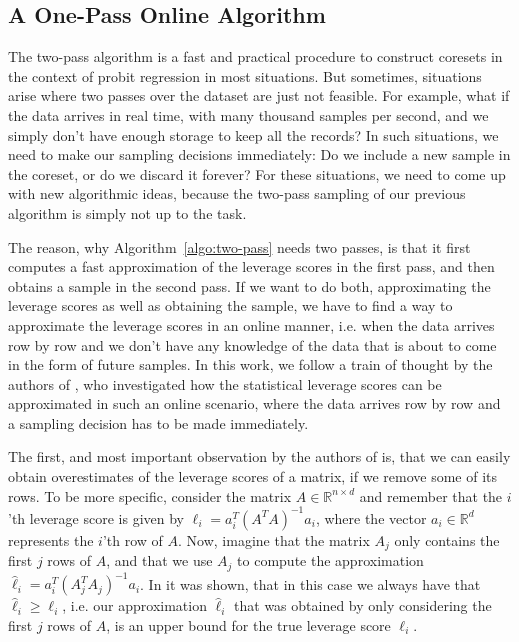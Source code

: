 \subsection{A One-Pass Online Algorithm}

The two-pass algorithm is a fast and practical procedure to
construct coresets in the context of probit regression in most
situations. But sometimes, situations arise where two passes
over the dataset are just not feasible.
For example, what if the data arrives in real time, with many thousand
samples per second, and we simply don't
have enough storage to keep all the records?
In such situations, we need to make our sampling decisions
immediately: Do we include a new sample in the coreset, or
do we discard it forever?
For these situations, we need to come up with new algorithmic
ideas, because the two-pass sampling of our previous algorithm
is simply not up to the task.

The reason, why Algorithm~\ref{algo:two-pass} needs two passes,
is that it first computes a fast approximation of the leverage
scores in the first pass, and then obtains a sample in the
second pass.
If we want to do both, approximating the leverage scores as
well as obtaining the sample, we have to find a way to
approximate the leverage scores in an online manner,
i.e. when the data arrives row by row and we don't have
any knowledge of the data that is about to come in the form
of future samples.
In this work, we follow a train of thought by the
authors of \cite{online-row-sampling}, who investigated
how the statistical leverage scores can be approximated
in such an online scenario, where the data arrives row by row
and a sampling decision has to be made immediately.

The first, and most important observation by the authors of
\cite{online-row-sampling} is, that we can easily obtain
overestimates of the leverage scores of a matrix, if we
remove some of its rows.
To be more specific, consider the matrix
$A \in \mathbb{R}^{n \times d}$ and remember that the
$i$'th leverage score is given by $\ell_i = a_i^T (A^TA)^{-1} a_i$,
where the vector $a_i \in \mathbb{R}^d$ represents the
$i$'th row of $A$.
Now, imagine that the matrix $A_j$ only contains the first
$j$ rows of $A$, and that we use $A_j$ to compute the
approximation $\hat{\ell}_i = a_i^T (A_j^TA_j)^{-1} a_i$.
In \cite{online-row-sampling} it was shown, that in this
case we always have that $\hat{\ell}_i \geq \ell_i$, i.e.
our approximation $\hat{\ell}_i$ that was obtained by only
considering the first $j$ rows of $A$, is an upper bound
for the true leverage score $\ell_i$.

